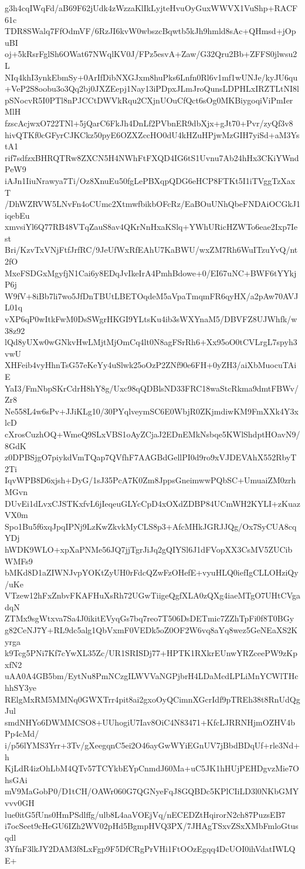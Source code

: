 g3h4cqIWqFd/aB69F62jUdk4zWzzaKlIkLyjteHvuOyGuxWWVX1VuShp+RACF61c
TDR8SWalq7FfOdmVF/6RzJI6kvW0wbszcBqwtb5kJh9hmld8sAc+QHmsd+jOpuBI
oj+5kRsrFglSh6OWat67NWqlKV0J/FPz5esvA+Zaw/G32Qru2Bb+ZFFS0jlwsu2L
NIq4khI3ynkEbmSy+0ArIfDibNXGJxm8huPks6Lnfn0Rl6v1mf1wUNJe/kyJU6qu
+VeP2S8oobu3o3Qq2bj0JXZEepj1Nay13iPDpxJLmJroQunsLDPHLxIRZTLtNI8l
pSNocvR5I0PTl8nPJCCtDWVkRqu2CXjnUOuCfQct6sOg0MKBiygoqiViPmIerMlH
fzscAcjwxO722TNl+5jQarC6FkJh4DnLf2PVbnER9dbXjx+gJt70+Pvr/zyQf3v8
hivQTKf0cGFyrCJKCkz50pyE6OZXZccHO0dU4kHZuHPjwMzGIH7yiSd+aM3YstA1
rif7sdfzxBHRQTRw8ZXCN5H4NWhFtFXQD4IG6tS1Uvnu7Ab24hHx3CKiYWndPeW9
iAJn1IiuNrawya7Ti/Oz8XnuEu50fgLePBXqpQDG6eHCP8FTKt5I1iTVggTzXaxT
/DhWZRVW5LNvFn4oCUmc2XtmwfbikbOFcRz/EaBOuUNhQbeFNDAiOCGkJ1iqebEu
xmvsiYl6Q77RB48VTqZauS8av4QKrNnHxaKSlq+YWhURicHZWTo6eae2Ixp7Iest
Bri/KzvTxVNjFtfJrfRC/9JeUfWxRfEAhU7KaBWU/wxZM7Rh6WuITzuYvQ/nt2fO
MxeFSDGxMgyfjN1Cai6y8EDqJvIkeIrA4PmhBdowe+0/EI67uNC+BWF6tYYkjP6j
W9fV+8iBb7li7wo5JfDnTBUtLBETOqdeM5aVpaTmqmFR6qyHX/a2pAw70AVJL01q
vXP6qP0wItkFwM0DsSWgrHKGI9YLtsKu4ib3sWXYnaM5/DBVFZ8UJWhfk/w38z92
lQd8yUXw0wGNkvHwLMjtMjOmCq4lt0N8agFSrRh6+Xx95oO0tCVLrgL7spyh3vwU
XHFeib4vyHhnTsG57eKeYy4uSlwk25oOzP2ZNf90e6FH+0yZH3/aiXbMuocuTAiE
YaI3/FmNbpSKrCdrH8hY8g/Uxc98qQDBlsND33FRC18waStcRkma9dmtFBWv/Zr8
Ne558L4w6sPv+JJiKLg10/30PYqlveymSC6E0WbjR0ZKjmdiwKM9FmXXk4Y3xlcD
cXrosCuzhOQ+WmeQ9SLxVBS1oAyZCjaJ2EDnEMkNsbqe5KWlShdptHOavN9/8GdK
z0DPBSjgO7piykdVmTQap7QVfhF7AAGBdGellPI0d9ro9xVJDEVAhX552RbyT2Ti
IqvWPB8D6xjsh+DyG/1sJ35PcA7K0Zm8JppsGneimwwPQbSC+UmuaiZM0zrhMGvn
DUvEi1dLvxCJSTKxfvL6jIeqeuGLYcCpD4xOXdZDBP84UCmWH2KYLI+zKuazVX0m
Spo1Bu5f6xqJpqIPNj9LzKwZkvkMyCLS8p3+AfcMHkJGRJJQg/Ox7SyCUA8cqYDj
hWDK9WLO+xpXaPNMe56JQ7jjTgrJiJq2gQIYSl6J1dFVopXX3CsMV5ZUCibWMFs9
bMKd8D1aZIWNJvpYOKtZyUH0rFdcQZwFzOHefE+vyuHLQ0iefIgCLLOHziQy/uKe
VTzew12hFxZnbvFKAFHuXsRh72UGwTiigeQgfXLA0zQXg4iaeMTgO7UHtCVgadqN
ZTMx9sgWtxva7Sa4J0ikitEVyqGs7bq7reo7T506DsDETmic7ZZhTpFi0f8T0BGy
g82CeNJ7Y+RL9dc5alg1QbVxmF0VEDk5oZ0OF2W6vq8aYq8wez5GeNEaXS2Kyrga
k9Tcg5PNi7Kf7cYwXL35Zc/UR1SRISDj77+HPTK1RXkrEUnwYRZceePW9zKpxfN2
uAA0A4GB5bm/EytNu8PmNCzgILWVVaNGPjbrH4LDaMcdLPLiMnYCWlTHchhSY3ye
RElgMxRM5MMNq0GWXTrr4pit8ai2gxoOyQCimnXGcrIdf9pTREh38t8RnUdQgJul
smdNHYo6DWMMCSO8+UUhogiU7Iav8OiC4N83471+KfcLJRRNHjmOZHV4bPp4cMd/
i/p56lYMS3Yrr+3Tv/gXeegqnC5ei2O46ayGwWYiEGnUV7jBbdBDqUf+rle3Nd+h
KjLdR4izOhLbM4QTv57TCYkbEYpCnmdJ60Ma+uC5JK1hHUjPEHDgvzMie7OhsGAi
mV9MaGobP0/D1tCH/OAWr060G7QGNyeFqJ8GQBDc5KPlCIiLD3l0NKbGMYvvv0GH
lue0itG5fUns0HmPSdlffg/ulb8L4aaVOEjVq/nECEDZtHqirorN2ch87PuzsEB7
i7ocSeet9cHeGU6IZh2WV02pHd5BgmpHVQ3PX/7JHAgTSxvZSxXMbFmloGtusqdl
3YfnF3lkJY2DAM3f8LxFgp9F5DfCRgPrVHi1FtOOzEgqq4DcUOI0ihVdatIWLQE+
